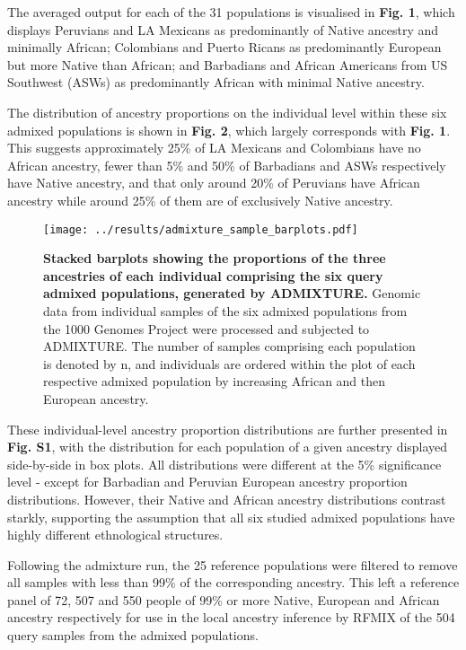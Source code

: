 \documentclass[11pt]{article}
\begin{document}
The averaged output for each of the 31 populations is visualised in \textbf{Fig. 1}, which displays Peruvians and LA Mexicans as predominantly of Native ancestry and minimally African; Colombians and Puerto Ricans as predominantly European but more Native than African; and Barbadians and African Americans from US Southwest (ASWs) as predominantly African with minimal Native ancestry.

The distribution of ancestry proportions on the individual level within these six admixed populations is shown in \textbf{Fig. 2}, which largely corresponds with \textbf{Fig. 1}. This suggests approximately 25\% of LA Mexicans and Colombians have no African ancestry, fewer than 5\% and 50\% of Barbadians and ASWs respectively have Native ancestry, and that only around 20\% of Peruvians have African ancestry while around 25\% of them are of exclusively Native ancestry.




\begin{figure}[htb!]%
    \centering
    \texttt{[image: 
        ../results/admixture\_sample\_barplots.pdf]} 
    \vspace{-.25cm}
    \caption{\textbf{
        Stacked barplots showing the proportions of the three ancestries of each individual comprising the six query admixed populations, generated by ADMIXTURE.
    }
        Genomic data from individual samples of the six admixed populations from the 1000 Genomes Project were processed and subjected to ADMIXTURE. The number of samples comprising each population is denoted by n, and individuals are ordered within the plot of each respective admixed population by increasing African and then European ancestry.
    }
\end{figure}





These individual-level ancestry proportion distributions are further presented in \textbf{Fig. S1}, with the distribution for each population of a given ancestry displayed side-by-side in box plots. All distributions were different at the 5\% significance level - except for Barbadian and Peruvian European ancestry proportion distributions. However, their Native and African ancestry distributions contrast starkly, supporting the assumption that all six studied admixed populations have highly different ethnological structures.

Following the admixture run, the 25 reference populations were filtered to remove all samples with less than 99\% of the corresponding ancestry. This left a reference panel of 72, 507 and 550 people of 99\% or more Native, European and African ancestry respectively for use in the local ancestry inference by RFMIX of the 504 query samples from the admixed populations. 
\end{document}

